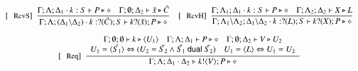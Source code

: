 \begin{figure}[!t]
\[\begin{array}{c}
		\trule{RcvS}~~\tree{
			\Gamma; \Lambda; \Delta_1 \cat k: S \proves P \hastype \Proc
			\quad
			\Gamma; \es; \Delta_2 \proves \tilde{x} \hastype \tilde{C}
		}{
			\Gamma; \Lambda; (\Delta_1\backslash\Delta_2) \cat k: \btinp{\tilde{C}} S \vdash \binp{k}{\tilde{x}} P \hastype \Proc
		}
		\quad
		\trule{RcvH}~~\tree{
			\Gamma; \Lambda_1; \Delta_1 \cat k: S \proves P \hastype \Proc
			\quad
			\Gamma; \Lambda_2; \Delta_2 \proves X \hastype L
		}{
			\Gamma; \Lambda_1\backslash\Lambda_2; \Delta_1 \backslash \Delta_2 \cat k: \btinp{L} S \proves \binp{k}{X} P \hastype \Proc
		}
		\\[6mm]


		\trule{Req}~~\tree{
			\begin{array}{c}
				\Gamma; \es; \es \proves k \hastype \chtype{U_1} %
				\quad
				\Gamma; \Lambda; \Delta_1 \proves P \hastype \Proc
				\quad
				\Gamma; \es; \Delta_2 \proves V \hastype U_2%
				\\
				U_1 = \tilde{\chtype{S_1}} \Leftrightarrow (U_2 = \tilde{S_2} \wedge \tilde{S_1} \dualof \tilde{S_2})
				\quad
				U_1 = \chtype{L} \Leftrightarrow U_1 = U_2
			\end{array}
		}{
			\Gamma; \Lambda; \Delta_1 \cat \Delta_2 \proves \bout{k}{V} P \hastype \Proc
		}
		\\[6mm]



\end{array}\]
\end{figure}
